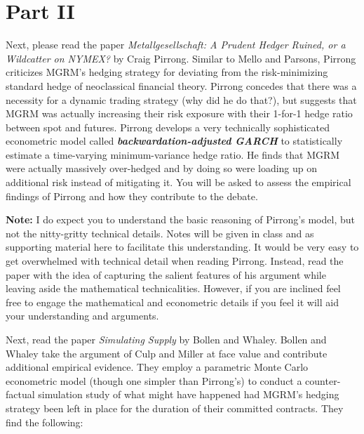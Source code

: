 \documentclass[12pt]{article}
\begin{document}
\newpage

\vspace{15mm}

\section*{Part II}

Next, please read the paper \textit{Metallgesellschaft: A Prudent Hedger Ruined, or a Wildcatter on NYMEX?} by Craig Pirrong. Similar to Mello and Parsons,
Pirrong criticizes MGRM's hedging strategy for deviating from the risk-minimizing standard hedge of neoclassical financial theory. Pirrong concedes that
there was a necessity for a dynamic trading strategy (why did he do that?), but suggests that MGRM was actually increasing their risk exposure with their
1-for-1 hedge ratio between spot and futures. Pirrong develops a very technically sophisticated econometric model called \textbf{\textit{backwardation-adjusted GARCH}}
to statistically estimate a time-varying minimum-variance hedge ratio. He finds that MGRM were actually massively over-hedged and by doing so were loading up on 
additional risk instead of mitigating it. You will be asked to assess the empirical findings of Pirrong and how they contribute to the debate.

\vspace{8mm}

\textbf{Note:} I do expect you to understand the basic reasoning of Pirrong's model, but not the nitty-gritty technical details. Notes will be given in class 
and as supporting material here to facilitate this understanding. It would be very easy to get overwhelmed with technical detail when reading Pirrong. Instead,
read the paper with the idea of capturing the salient features of his argument while leaving aside the mathematical technicalities. However, if you are inclined
feel free to engage the mathematical and econometric details if you feel it will aid your understanding and arguments.

\vspace{10mm}

Next, read the paper \textit{Simulating Supply} by Bollen and Whaley. Bollen and Whaley take the argument of Culp and Miller at face value and contribute
additional empirical evidence. They employ a parametric Monte Carlo econometric model (though one simpler than Pirrong's) to conduct a counter-factual 
simulation study of what might have happened had MGRM's hedging strategy been left in place for the duration of their committed contracts. They find the following:
\end{document}
